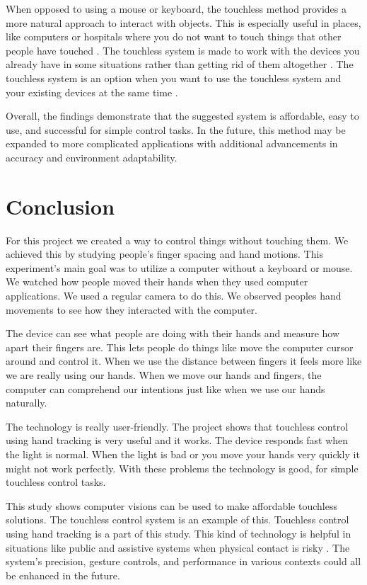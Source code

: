 \documentclass[conference]{IEEEtran}
\begin{document}
When opposed to using a mouse or keyboard, the touchless method provides a more natural approach to interact with objects. This is especially useful in places, like computers or hospitals where you do not want to touch things that other people have touched \cite{ref10}. The touchless system is made to work with the devices you already have in some situations rather than getting rid of them altogether \cite{ref4}. The touchless system is an option when you want to use the touchless system and your existing devices at the same time \cite{ref2}.

Overall, the findings demonstrate that the suggested system is affordable, easy to use, and successful for simple control tasks. In the future, this method may be expanded to more complicated applications with additional advancements in accuracy and environment adaptability.

\section{Conclusion}
For this project we created a way to control things without touching them. We achieved this by studying people's finger spacing and hand motions. This experiment's main goal was to utilize a computer without a keyboard or mouse. We watched how people moved their hands when they used computer applications. We used a regular camera to do this. We observed peoples hand movements to see how they interacted with the computer.

The device can see what people are doing with their hands and measure how apart their fingers are. This lets people do things like move the computer cursor around and control it. When we use the distance between fingers it feels more like we are really using our hands. When we move our hands and fingers, the computer can comprehend our intentions just like when we use our hands naturally.

The technology is really user-friendly. The project shows that touchless control using hand tracking is very useful and it works. The device responds fast when the light is normal. When the light is bad or you move your hands very quickly it might not work perfectly. With these problems the technology is good, for simple touchless control tasks.

This study shows computer visions can be used to make affordable touchless solutions. The touchless control system is an example of this. Touchless control using hand tracking is a part of this study. This kind of technology is helpful in situations like public and assistive systems when physical contact is risky \cite{ref6}. The system's precision, gesture controls, and performance in various contexts could all be enhanced in the future.
\end{document}
